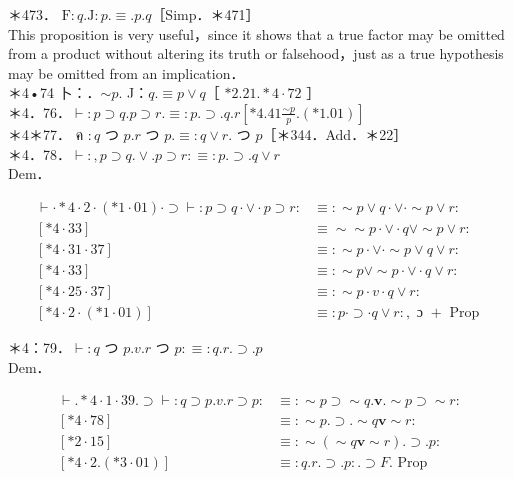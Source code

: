 \documentclass[10pt]{article}
\begin{document}
＊473． $\mathrm{F}: q . \mathrm{J}: p . \equiv . p . q$［Simp．＊471］\\
This proposition is very useful，since it shows that a true factor may be omitted from a product without altering its truth or falsehood，just as a true hypothesis may be omitted from an implication．\\
＊4•74 卜：．$\sim p$. J：$q . \equiv p \vee q$［ $* 2.21 . * 4 \cdot 72$ ］\\
＊4．76．$\vdash: p \supset q . p \supset r . \equiv: p . \supset . q . r\left[* 4.41 \frac{\sim p}{p} .(* 1.01)\right]$\\
＊4＊77． ค $: q$ つ $p . r$ つ $p . \equiv: q \vee r$. つ $p$［＊344．Add．＊22］\\
＊4．78．$\vdash:, p \supset q . \vee . p \supset r: \equiv: p . \supset . q \vee r$\\
Dem．

$$
\begin{array}{ll}
\vdash \cdot * 4 \cdot 2 \cdot(* 1 \cdot 01) \cdot \supset \vdash: p \supset q \cdot \vee \cdot p \supset r: & \equiv: \sim p \vee q \cdot \vee \cdot \sim p \vee r: \\
{[* 4 \cdot 33]} & \equiv \sim \sim p \cdot \vee \cdot q \vee \sim p \vee r: \\
{[* 4 \cdot 31 \cdot 37]} & \equiv: \sim p \cdot \vee \cdot \sim p \vee q \vee r: \\
{[* 4 \cdot 33]} & \equiv: \sim p \vee \sim p \cdot \vee \cdot q \vee r: \\
{[* 4 \cdot 25 \cdot 37]} & \equiv: \sim p \cdot v \cdot q \vee r: \\
{[* 4 \cdot 2 \cdot(* 1 \cdot 01)]} & \equiv: p \cdot \supset \cdot q \vee r:, \text { ɔ }+ \text { Prop }
\end{array}
$$

＊4：79．$\vdash: q$ つ $p . v . r$ つ $p: \equiv: q . r . \supset . p$\\
Dem．

$$
\begin{array}{ll}
\vdash . * 4 \cdot 1 \cdot 39 . \supset \vdash: q \supset p . v . r \supset p: & \equiv: \sim p \supset \sim q . \mathbf{v} . \sim p \supset \sim r: \\
{[* 4 \cdot 78]} & \equiv: \sim p . \supset . \sim q \mathbf{v} \sim r: \\
{[* 2 \cdot 15]} & \equiv: \sim(\sim q \mathbf{v} \sim r) . \supset . p: \\
{[* 4 \cdot 2 .(* 3 \cdot 01)]} & \equiv: q . r . \supset . p: . \supset F . \text { Prop }
\end{array}
$$
\end{document}
